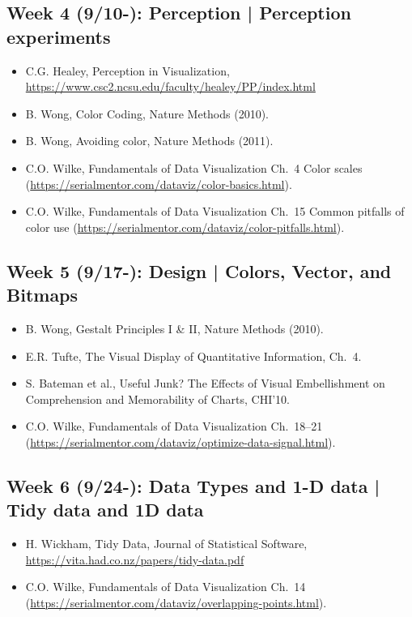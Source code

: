 \documentclass[11pt,article,oneside]{memoir} %
\begin{document}
\subsection{Week 4 (9/10-): Perception | Perception experiments }

\begin{itemize}\itemsep0em 
\item C.G. Healey, Perception in Visualization, \url{https://www.csc2.ncsu.edu/faculty/healey/PP/index.html}
\item B. Wong, Color Coding, Nature Methods (2010).
\item B. Wong, Avoiding color, Nature Methods (2011). 
\item C.O. Wilke, Fundamentals of Data Visualization Ch.~4 Color scales (\url{https://serialmentor.com/dataviz/color-basics.html}). 
\item C.O. Wilke, Fundamentals of Data Visualization Ch.~15 Common pitfalls of color use (\url{https://serialmentor.com/dataviz/color-pitfalls.html}).
\end{itemize}	

\subsection{Week 5 (9/17-): Design | Colors, Vector, and Bitmaps }

\begin{itemize}\itemsep0em 
\item B. Wong, Gestalt Principles I \& II, Nature Methods (2010). 
\item E.R. Tufte, The Visual Display of Quantitative Information, Ch.~4.
\item S. Bateman et al., Useful Junk? The Effects of Visual Embellishment on Comprehension and Memorability of Charts, CHI'10.
\item C.O. Wilke, Fundamentals of Data Visualization Ch.~18--21 (\url{https://serialmentor.com/dataviz/optimize-data-signal.html}). 
\end{itemize}	

\subsection{Week 6 (9/24-): Data Types and 1-D data | Tidy data and 1D data } 

\begin{itemize}\itemsep0em 
\item H. Wickham, Tidy Data, Journal of Statistical Software, \url{https://vita.had.co.nz/papers/tidy-data.pdf}
\item C.O. Wilke, Fundamentals of Data Visualization Ch.~14 (\url{https://serialmentor.com/dataviz/overlapping-points.html}). 
\end{itemize}	
\end{document}
